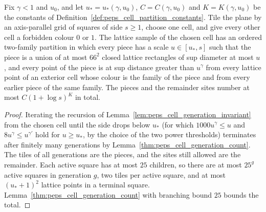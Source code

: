 \begin{lemma}
    \label{thm:peps_cell_two_family_partition_explicit}
    \leanok
    Fix $\gamma<1$ and $u_0$, and let $u_*=u_*(\gamma,u_0)$, $C=C(\gamma,u_0)$
    and $K=K(\gamma,u_0)$ be the constants of
    Definition~\ref{def:peps_cell_partition_constants}. Tile the plane by an
    axis-parallel grid of squares of side $s\ge1$, choose one cell, and give
    every other cell a forbidden colour $0$ or $1$. The lattice sample of the
    chosen cell has an ordered two-family partition in which every piece has a
    scale $u\in[u_*,s]$ such that the piece is a union of at most $66^2$ closed
    lattice rectangles of sup diameter at most $u$, and every point of the
    piece is at sup distance greater than $u^{\gamma}$ from every lattice point
    of an exterior cell whose colour is the family of the piece and from every
    earlier piece of the same family. The pieces and the remainder sites
    number at most $C(1+\log s)^{K}$ in total.
\end{lemma}
\begin{proof}\leanok
    Iterating the recursion of Lemma~\ref{lem:peps_cell_generation_invariant}
    from the chosen cell until the side drops below $u_*$ (for which
    $1000u^{\gamma}\le u$ and $8u^{\gamma}\le u^{\gamma'}$ hold for $u\ge u_*$,
    by the choice of the two power thresholds) terminates after finitely
    many generations by Lemma~\ref{thm:peps_cell_generation_count}. The tiles of all generations are the pieces, and the
    sites still allowed are the remainder. Each active square has at most
    $25$ children, so there are at most $25^{g}$ active squares in generation
    $g$, two tiles per active square, and at most $(u_*+1)^2$ lattice points
    in a terminal square. Lemma~\ref{thm:peps_cell_generation_count} with
    branching bound $25$ bounds the total.
\end{proof}

